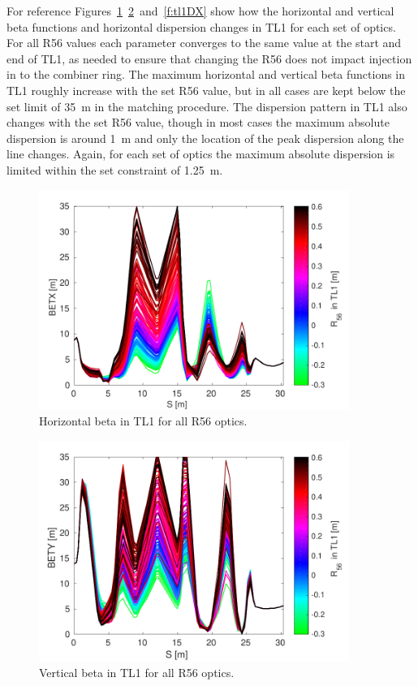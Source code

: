 For reference Figures~\ref{f:tl1BETX}~\ref{f:tl1BETY}~and~\ref{f:tl1DX} show how the horizontal and vertical beta functions and horizontal dispersion changes in TL1 for each set of optics. For all R56 values each parameter converges to the same value at the start and end of TL1, as needed to ensure that changing the R56 does not impact injection in to the combiner ring. The maximum horizontal and vertical beta functions in TL1 roughly increase with the set R56 value, but in all cases are kept below the set limit of 35~m in the matching procedure. The dispersion pattern in TL1 also changes with the set R56 value, though in most cases the maximum absolute dispersion is around 1~m and only the location of the peak dispersion along the line changes. Again, for each set of optics the maximum absolute dispersion is limited within the set constraint of 1.25~m. 

\begin{figure}
  \centering
  \includegraphics[width=0.9\textwidth]{Figures/propagation/BETX}
  \caption{Horizontal beta in TL1 for all R56 optics.}
  \label{f:tl1BETX}
\end{figure}

\begin{figure}
  \centering
  \includegraphics[width=0.9\textwidth]{Figures/propagation/BETY}
  \caption{Vertical beta in TL1 for all R56 optics.}
  \label{f:tl1BETY}
\end{figure}

